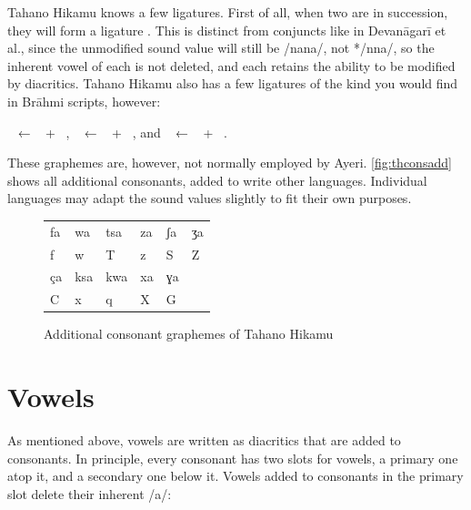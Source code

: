 Tahano Hikamu knows a few ligatures. First of all, when two   
are in succession, they will form a ligature  . This is 
distinct from conjuncts like in Devanāgarī et al., since the unmodified sound 
value will still be /nana/, not */nna/, so the inherent vowel of each  
 is not deleted, and each   retains the ability to be 
modified by diacritics. Tahano Hikamu also has a few ligatures of the kind you 
would find in Brāhmi scripts, however:

\pex
	\a {}~ ← ~ + ~,
	\a {}~ ← ~ + ~, and 
	\a {}~ ← ~ + ~.
\xe

\noindent These graphemes are, however, not normally employed by Ayeri. 
\autoref{fig:thconsadd} shows all additional consonants, added to write other 
languages. Individual languages may adapt the sound values slightly to fit their 
own purposes.

\begin{figure}[ht]
\caption{Additional consonant graphemes of Tahano Hikamu}

\begin{tabu} to \linewidth{X[c] X[c] X[c] X[c] X[c] X[c]}
\toprule
\tableheaderfont	fa & wa & tsa & za & ʃa & ʒa \\
\rowfont{\Tagati\huge}	f & w & T & z & S & Z \\

\midrule

\tableheaderfont	ça & ksa & kwa & xa & ɣa \\
\rowfont{\Tagati\huge}	C & x & q & X & G \\

\bottomrule
\end{tabu}
\label{fig:thconsadd}
\end{figure}


\section{Vowels}

As mentioned above, vowels are written as diacritics that are added to 
consonants. In principle, every consonant has two slots for vowels, a primary 
one atop it, and a secondary one below it. Vowels added to consonants in 
the primary slot delete their inherent /a/:

